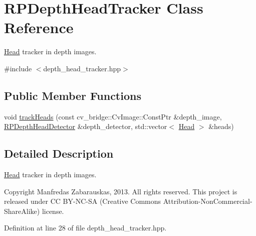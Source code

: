 \hypertarget{class_r_p_depth_head_tracker}{\section{\-R\-P\-Depth\-Head\-Tracker \-Class \-Reference}
\label{class_r_p_depth_head_tracker}
}


\hyperlink{struct_head}{\-Head} tracker in depth images.  




{\ttfamily \#include $<$depth\-\_\-head\-\_\-tracker.\-hpp$>$}

\subsection*{\-Public \-Member \-Functions}
\begin{DoxyCompactItemize}
\item 
void \hyperlink{class_r_p_depth_head_tracker_a6fa2375a21e8d7b0395b086c16944bc8}{track\-Heads} (const cv\-\_\-bridge\-::\-Cv\-Image\-::\-Const\-Ptr \&depth\-\_\-image, \hyperlink{class_r_p_depth_head_detector}{\-R\-P\-Depth\-Head\-Detector} \&depth\-\_\-detector, std\-::vector$<$ \hyperlink{struct_head}{\-Head} $>$ \&heads)
\end{DoxyCompactItemize}


\subsection{\-Detailed \-Description}
\hyperlink{struct_head}{\-Head} tracker in depth images. 

\begin{DoxyCopyright}{\-Copyright}
\-Manfredas \-Zabarauskas, 2013. \-All rights reserved. \-This project is released under \-C\-C \-B\-Y-\/\-N\-C-\/\-S\-A (\-Creative \-Commons \-Attribution-\/\-Non\-Commercial-\/\-Share\-Alike) license. 
\end{DoxyCopyright}


\-Definition at line 28 of file depth\-\_\-head\-\_\-tracker.\-hpp.



